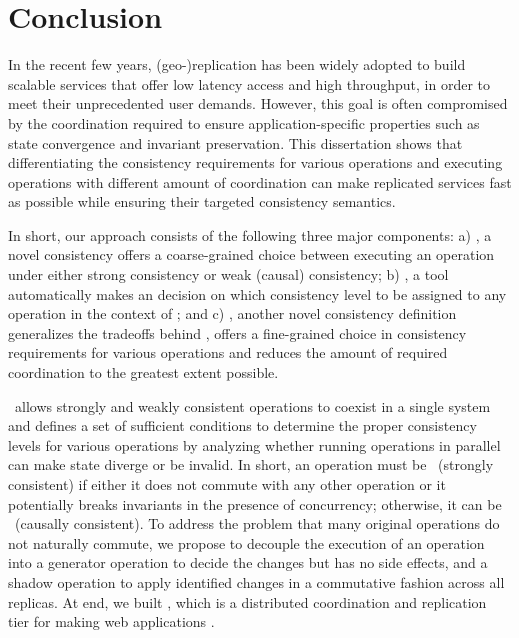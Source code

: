 \chapter{Conclusion}
\label{chapter:conclude}

In the recent few years, (geo-)replication has been widely adopted to build scalable services
that offer low latency access and high throughput, in order to meet
their unprecedented user demands. However,
this goal is often compromised by the coordination required to 
ensure application-specific properties such as state convergence and invariant preservation.
This dissertation shows that differentiating the consistency requirements for various operations
and executing operations with different amount of coordination can make
replicated services fast as possible while ensuring their targeted consistency semantics. 

In short, our approach consists of the following three major components: a) \RBCN, a novel
consistency offers a coarse-grained choice between executing an operation under either
strong consistency or weak (causal) consistency; b) \tool,
a tool automatically makes an decision on which consistency level to be assigned to any
operation in the context of \RBCN; and c) \PRCN,
another novel consistency definition generalizes the tradeoffs behind \RBCN, offers a fine-grained
choice in consistency requirements for various operations and reduces the amount of
required coordination to the greatest extent possible.

\RBCN\ allows strongly and weakly consistent operations to coexist
in a single system and defines a set of sufficient conditions to determine the proper
consistency levels for various operations by analyzing
whether running operations in parallel can make state diverge or be invalid. In short, 
an operation must be \red\ (strongly consistent) if either it does not commute with any other operation or
it potentially breaks invariants in the presence of concurrency; otherwise, it can be \blue\ (causally consistent). 
To address the problem that many original operations do not naturally commute,
we propose to decouple the execution of an operation into a generator operation to decide
the changes but has no side effects, and a shadow operation to apply identified changes in
a commutative fashion across all replicas. At end, we built \gemini, which is 
a distributed coordination and replication tier for making web applications \RBct.


